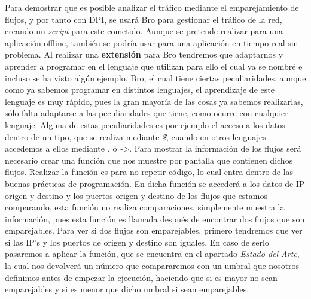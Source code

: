 \noindent Para demostrar que es posible analizar el tráfico mediante el emparejamiento 
de flujos, y por tanto con DPI, se usará Bro para gestionar el tráfico de 
la red, creando un \textit{script} para este cometido. Aunque se pretende 
realizar para una aplicación offline, también se podría usar para una 
aplicación en tiempo real sin problema.
\intro
Al realizar una \textbf{extensión} para Bro tendremos que adaptarnos y aprender a 
programar en el lenguaje que utilizan para ello el cual ya se nombré e incluso se ha visto algún ejemplo, 
Bro, el cual tiene ciertas peculiaridades, aunque como ya sabemos 
programar en distintos lenguajes, el 
aprendizaje de este lenguaje es muy rápido, pues la gran mayoría de las cosas 
ya sabemos realizarlas, sólo falta adaptarse a las peculiaridades que tiene, como ocurre con 
cualquier lenguaje. Alguna de estas peculiaridades es por ejemplo el acceso a 
los datos dentro de un tipo, que se realiza mediante \textit{\$}, cuando en otros 
lenguajes accedemos a ellos mediante \textit{.} ó \textit{->}.
\intro
Para mostrar la información de los flujos será necesario crear una función 
que nos muestre por pantalla que contienen dichos flujos. Realizar la función 
es para no repetir código, lo cual entra dentro de las buenas prácticas de 
programación. En dicha función se accederá a los datos de IP origen y 
destino y los puertos origen y destino de los flujos que estamos comparando, 
esta función no realiza comparaciones, simplemente muestra la información, 
pues esta función es llamada después de encontrar dos flujos que son emparejables.
\intro
Para ver si dos flujos son emparejables, primero tendremos que ver si las IP’s 
y los puertos de origen y destino son iguales. En caso de serlo pasaremos a 
aplicar la función, que se encuentra en el apartado \textit{Estado del Arte}, la cual nos devolverá 
un número que compararemos con un umbral que nosotros definimos antes de empezar la ejecución, haciendo que 
si es mayor no sean emparejables y si es menor que dicho umbral si sean emparejables.